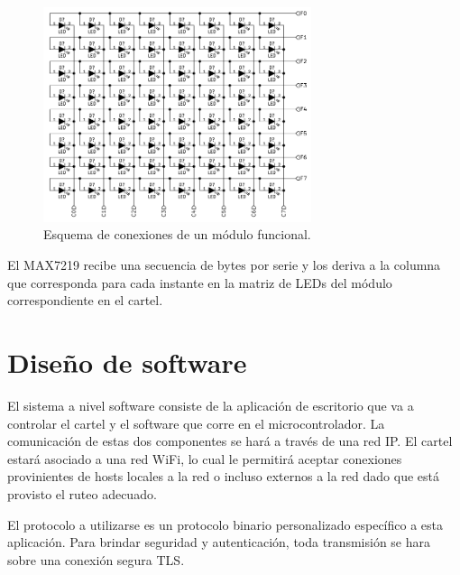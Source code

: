\begin{figure}[ht!]
	\begin{center}
		\includegraphics[width=0.7\textwidth]{imagenes/hw/moduloLED}
		\caption{Esquema de conexiones de un módulo funcional.}
		\label{fig:hw-moduloLED}
	\end{center}
\end{figure}

El MAX7219 recibe una secuencia de bytes por serie y los deriva a la columna que corresponda para cada instante en la matriz de LEDs del módulo correspondiente en el cartel. 

\section{Diseño de software}
El sistema a nivel software consiste de la aplicación de escritorio que va a controlar el cartel y el software que corre en el microcontrolador.
La comunicación de estas dos componentes se hará a través de una red IP. El cartel estará asociado a una red WiFi, lo cual le permitirá aceptar conexiones provinientes de hosts locales a la red o incluso externos a la red dado que está provisto el ruteo adecuado. 

El protocolo a utilizarse es un protocolo binario personalizado específico a esta aplicación. Para brindar seguridad y autenticación, toda transmisión se hara sobre una conexión segura TLS. 

